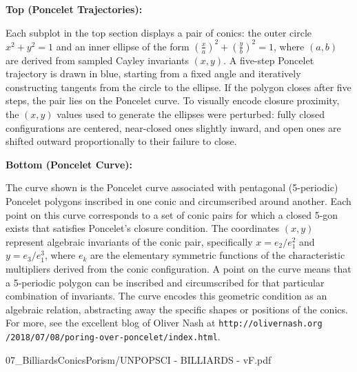 \begin{SideNotePage}{
  \textbf{Top (Poncelet Trajectories):} \par
  Each subplot in the top section displays a pair of conics: the outer circle $x^2 + y^2 = 1$ and an inner ellipse of the form $\left(\frac{x}{a}\right)^2 + \left(\frac{y}{b}\right)^2 = 1$, where $(a, b)$ are derived from sampled Cayley invariants $(x, y)$. A five-step Poncelet trajectory is drawn in blue, starting from a fixed angle and iteratively constructing tangents from the circle to the ellipse. If the polygon closes after five steps, the pair lies on the Poncelet curve. To visually encode closure proximity, the $(x, y)$ values used to generate the ellipses were perturbed: fully closed configurations are centered, near-closed ones slightly inward, and open ones are shifted outward proportionally to their failure to close.

  \vspace{1.5em}
  \textbf{Bottom (Poncelet Curve):} \par
  The curve shown is the Poncelet curve associated with pentagonal (5-periodic) Poncelet polygons inscribed in one conic and circumscribed around another. Each point on this curve corresponds to a set of conic pairs for which a closed 5-gon exists that satisfies Poncelet’s closure condition. The coordinates $(x, y)$ represent algebraic invariants of the conic pair, specifically $x = e_2 / e_1^2$ and $y = e_3 / e_1^3$, where $e_k$ are the elementary symmetric functions of the characteristic multipliers derived from the conic configuration. A point on the curve means that a 5-periodic polygon can be inscribed and circumscribed for that particular combination of invariants. The curve encodes this geometric condition as an algebraic relation, abstracting away the specific shapes or positions of the conics. For more, see the excellent blog of Oliver Nash at \texttt{http://olivernash.org\\/2018/07/08/poring-over-poncelet/index.html}.
}{07_BilliardsConicsPorism/UNPOPSCI - BILLIARDS - vF.pdf}
\end{SideNotePage}

